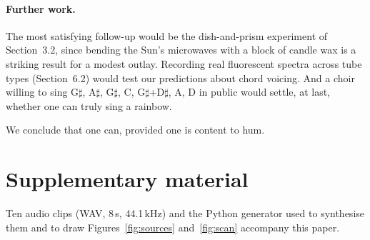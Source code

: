 \documentclass[11pt,a4paper]{article}
\newcommand{\sh}{\ensuremath{\sharp}}
\begin{document}
\paragraph{Further work.} The most satisfying follow-up would be the dish-and-prism experiment of Section~3.2, since bending the Sun's microwaves with a block of candle wax is a striking result for a modest outlay. Recording real fluorescent spectra across tube types (Section~6.2) would test our predictions about chord voicing. And a choir willing to sing G\sh, A\sh, G\sh, C, G\sh+D\sh, A, D in public would settle, at last, whether one can truly sing a rainbow.

We conclude that one can, provided one is content to hum.

\section*{Supplementary material}
Ten audio clips (WAV, 8\,s, 44.1\,kHz) and the Python generator used to synthesise them and to draw Figures~\ref{fig:sources} and~\ref{fig:scan} accompany this paper.


\end{document}
